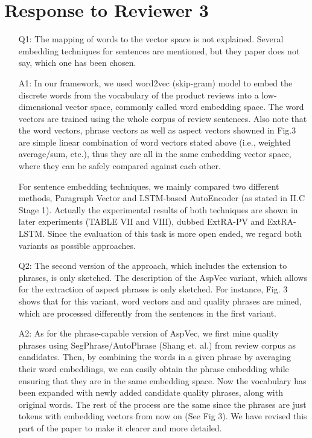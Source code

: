 \section{Response to Reviewer 3}
\begin{itemize}
\item [Q1:] 
The mapping of words to the vector space is not explained. Several	embedding techniques for sentences are mentioned, but they paper does not say, which one has been chosen. 
	\item [A1:] In our framework, we used word2vec (skip-gram) model to embed the discrete words from the vocabulary of the product reviews into a low-dimensional vector space, commonly called word embedding space. The word vectors are trained using the whole corpus of review sentences. Also note that the word vectors, phrase vectors as well as aspect vectors showned in Fig.3 are simple linear combination of word vectors stated above (i.e., weighted average/sum, etc.), 
thus they are all in the same embedding vector space, where they can be 
safely compared against each other.
	
For sentence embedding techniques, we mainly compared two different methods, 
Paragraph Vector and LSTM-based AutoEncoder (as stated in II.C Stage 1). 
Actually the experimental results of both techniques are shown in later experiments (TABLE VII and VIII), dubbed ExtRA-PV and ExtRA-LSTM. 
Since the evaluation of this task is more open ended, we regard both 
variants as possible approaches.
	
\item [Q2:] 
The second version of the approach, which includes the extension to phrases, is only sketched. The description of the AspVec variant, which allows for the extraction of aspect phrases is only sketched. For instance, Fig. 3 shows that for this variant, word vectors and and quality phrases are mined, which are processed differently from the sentences in the first variant. 

\item [A2:] As for the phrase-capable version of AspVec, we first mine quality phrases using SegPhrase/AutoPhrase (Shang et. al.) from review corpus as candidates. Then, by combining the words in a given phrase by averaging their word embeddings, we can easily obtain the phrase embedding while ensuring that they are in the same embedding space. Now the vocabulary has been expanded with newly added candidate quality phrases, along with original words. The rest of the process are the same since the phrases are just tokens with embedding vectors from now on (See Fig 3). We have revised this part of the paper to make it clearer and more detailed.
	

\end{itemize}
